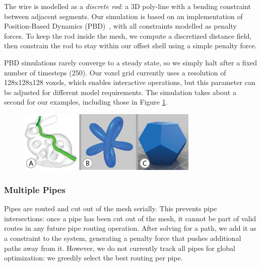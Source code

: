 The wire is modelled as a \emph{discrete rod}: a 3D poly-line with a bending 
constraint between adjacent segments. Our simulation is based on an
implementation of Position-Based Dynamics (PBD)~\cite{Muller07}, with all constraints
modelled as penalty forces. To keep the rod inside the
mesh, we compute a discretized distance field, then constrain the
rod to stay within our offset shell using a simple penalty force.


PBD simulations rarely converge to a steady state, so we simply halt after a fixed number of timesteps (250). Our voxel grid currently uses a resolution of 128x128x128 voxels, which enables interactive operations, but this parameter can be adjusted for different model requirements. The simulation takes about a second for our examples, including those in Figure \ref{fig:complex}.

\begin{figure}[h!]
\centering
    \includegraphics[width=3.4in]{figures/routing-tests.png}
\caption{}
\label{fig:complex}
\end{figure}

\subsubsection{Multiple Pipes}
Pipes are routed and cut out of the mesh serially. This prevents pipe intersections: once a pipe has been cut out of the mesh, it cannot be part of valid routes in any future pipe routing operation. After solving for a path, we add it as a constraint to the system, generating
a penalty force that pushes additional paths away from it.  However, we do not currently track all pipes for global optimization: we greedily select the best routing per pipe. 

